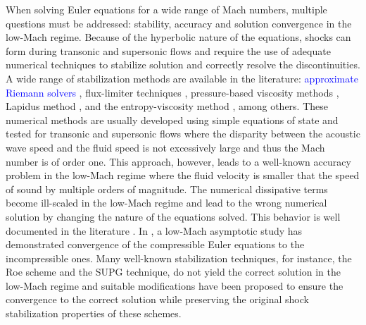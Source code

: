 \documentclass[preprint,10pt]{elsarticle}
\newcommand{\tcr}[1]{\textcolor{red}{#1}}
\newcommand{\tcb}[1]{\textcolor{blue}{#1}}
\begin{document}
When solving Euler equations for a wide range of Mach numbers, multiple questions must be addressed: stability, 
accuracy and solution convergence in the low-Mach regime. Because of the hyperbolic nature of the equations, 
shocks can form during transonic and supersonic flows and require the use of adequate numerical techniques to stabilize solution
and correctly resolve the discontinuities. A wide range of stabilization methods are available in the literature: \tcb{approximate Riemann solvers} \cite{Toro}, flux-limiter techniques 
\cite{FluxLimiter, FluxLimiter2}, pressure-based viscosity methods \cite{PBV_book}, Lapidus method \cite{Lapidus_paper, LMP, Lapidus_book}, 
and the entropy-viscosity method \cite{jlg1, jlg2}, among others. These numerical methods are usually developed using simple equations 
of state and tested for transonic and supersonic flows where the disparity between the acoustic wave speed and the fluid speed is not 
excessively large and thus the Mach number is of order one. This approach, however, leads to a well-known accuracy problem in the low-Mach regime 
where the fluid velocity is smaller that the speed of sound by multiple orders of magnitude. The numerical dissipative terms become 
ill-scaled in the low-Mach regime and lead to the wrong numerical solution by changing the nature of the equations solved. This 
behavior is well documented in the literature \cite{LowMach1, LowMach2, LowMach3}.
In \cite{LowMach1}, a low-Mach asymptotic study has demonstrated convergence of the 
compressible Euler equations to the incompressible ones. 
Many well-known stabilization techniques, for instance, the Roe scheme and the SUPG technique,
do not yield the correct solution in the low-Mach regime and suitable modifications have been proposed \cite{Roe,LowMach3}
to ensure the convergence to the correct solution while preserving the original shock stabilization 
properties of these schemes. 
%
\end{document}
